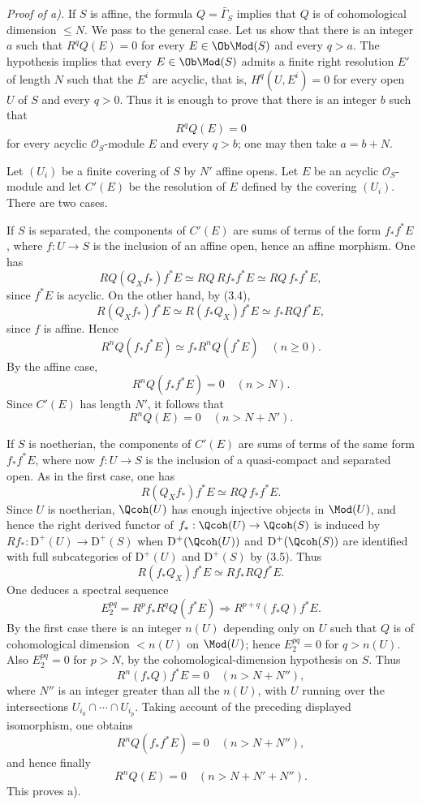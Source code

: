 \documentclass[11pt]{article}
\begin{document}
\emph{Proof of a).} If $S$ is affine, the formula $Q=\widetilde{\Gamma_S}$ implies that $Q$ is of cohomological dimension $\leq N$. We pass to the general case. Let us show that there is an integer $a$ such that $R^qQ(E)=0$ for every $E\in\Ob\Mod(S)$ and every $q>a$. The hypothesis implies that every $E\in\Ob\Mod(S)$ admits a finite right resolution $E'$ of length $N$ such that the $E^i$ are acyclic, that is, $H^q(U,E^i)=0$ for every open $U$ of $S$ and every $q>0$. Thus it is enough to prove that there is an integer $b$ such that
\[
 R^qQ(E)=0
\]
for every acyclic $\mathcal O_S$-module $E$ and every $q>b$; one may then take $a=b+N$.

Let $(U_i)$ be a finite covering of $S$ by $N'$ affine opens. Let $E$ be an acyclic $\mathcal O_S$-module and let $C'(E)$ be the resolution of $E$ defined by the covering $(U_i)$. There are two cases.

If $S$ is separated, the components of $C'(E)$ are sums of terms of the form $f_*f^*E$, where $f:U\to S$ is the inclusion of an affine open, hence an affine morphism. One has
\[
 RQ(Q_Xf_*)f^*E\simeq RQ\,Rf_*f^*E\simeq RQ\,f_*f^*E,
\]
since $f^*E$ is acyclic. On the other hand, by (3.4),
\[
 R(Q_Xf_*)f^*E\simeq R(f_*Q_X)f^*E\simeq f_*RQf^*E,
\]
since $f$ is affine. Hence
\[
 R^nQ(f_*f^*E)\simeq f_*R^nQ(f^*E)\quad(n\geq0).
\]
By the affine case,
\[
 R^nQ(f_*f^*E)=0\quad(n>N).
\]
Since $C'(E)$ has length $N'$, it follows that
\[
 R^nQ(E)=0\quad(n>N+N').
\]

If $S$ is noetherian, the components of $C'(E)$ are sums of terms of the same form $f_*f^*E$, where now $f:U\to S$ is the inclusion of a quasi-compact and separated open. As in the first case, one has
\[
 R(Q_Xf_*)f^*E\simeq RQ\,f_*f^*E.
\]
Since $U$ is noetherian, $\Qcoh(U)$ has enough injective objects in $\Mod(U)$, and hence the right derived functor of $f_*:\Qcoh(U)\to\Qcoh(S)$ is induced by $Rf_*:\mathrm D^+(U)\to\mathrm D^+(S)$ when $\mathrm D^+(\Qcoh(U))$ and $\mathrm D^+(\Qcoh(S))$ are identified with full subcategories of $\mathrm D^+(U)$ and $\mathrm D^+(S)$ by (3.5). Thus
\[
 R(f_*Q_X)f^*E\simeq Rf_*RQf^*E.
\]
One deduces a spectral sequence
\[
 E_2^{pq}=R^pf_*R^qQ(f^*E)\Longrightarrow R^{p+q}(f_*Q)f^*E.
\]
By the first case there is an integer $n(U)$ depending only on $U$ such that $Q$ is of cohomological dimension $<n(U)$ on $\Mod(U)$; hence $E_2^{pq}=0$ for $q>n(U)$. Also $E_2^{pq}=0$ for $p>N$, by the cohomological-dimension hypothesis on $S$. Thus
\[
 R^n(f_*Q)f^*E=0\quad(n>N+N''),
\]
where $N''$ is an integer greater than all the $n(U)$, with $U$ running over the intersections $U_{i_0}\cap\cdots\cap U_{i_p}$. Taking account of the preceding displayed isomorphism, one obtains
\[
 R^nQ(f_*f^*E)=0\quad(n>N+N''),
\]
and hence finally
\[
 R^nQ(E)=0\quad(n>N+N'+N'').
\]
This proves a).
\end{document}
